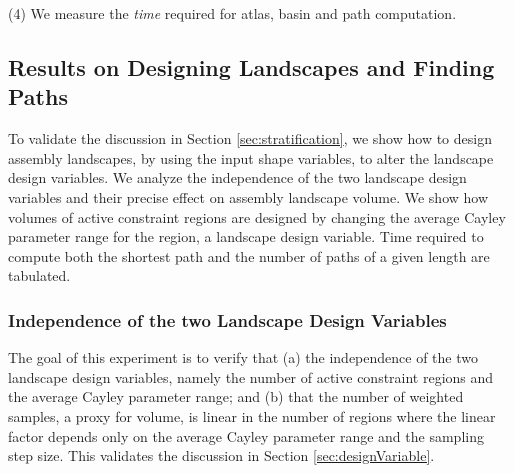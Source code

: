 \documentclass[]{article}
\newcommand{\rmc}{rigid molecular component}
\begin{document}
(4) We measure the {\sl time} required for atlas, basin and path computation.

\subsection{Results on Designing Landscapes and Finding Paths} 
\label{sec:results:design}
To validate the discussion in Section \ref{sec:stratification}, we show how to
design assembly landscapes, by using the input shape variables, to alter the
landscape design variables.  We analyze the independence of the two landscape
design variables and their precise effect on assembly landscape volume.  We
show how volumes of active constraint regions are designed by changing the
average Cayley parameter range for the region, a landscape design variable.
Time required to compute both the shortest path and the number of paths of a
given length are tabulated. 

\subsubsection{Independence of the two Landscape Design Variables}
\label{sec:results:LandscapeVariables}
The goal of this experiment is to verify that (a) the independence of the two
landscape design variables, namely the number of active constraint regions and
the average Cayley parameter range; and (b) that the number of weighted
samples, a proxy for volume, is linear in the number of regions where the
linear factor depends only on the average Cayley parameter range and the
sampling step size.  This validates the discussion in Section
\ref{sec:designVariable}.
\begin{figure*}[htpb]
\centering
{}
\caption{\scriptsize \textbf{Results Illustrating the Effects of Landscape Design Variables on the Atlas}:
(a) Plot of the average Cayley parameter value and the number of 
regions against weighted samples for 3D regions. These regions 
are the descendants of the 10 5D regions for the 6 input \rmc\ 
pairs described in Section \ref{sec:expSetup}. A bivariate 
function fit conforms to the prediction that the number of 
samples is cubic in average Cayley parameter range and linear 
in the number of regions. (b) Slices of the bivariate function 
in (a) at Cayley parameter values corresponding to the average 
3D Cayley parameter values of the different input \rmc\ pairs.
(c) Independently plots the number of 3D regions against the 
number of weighted 3D samples for the 6 input \rmc\ pairs, 
showing a match between observation and prediction. 
See text in Section \ref{sec:results:LandscapeVariables} for details.}
\label{fig:CRS}
\end{figure*}
\end{document}
